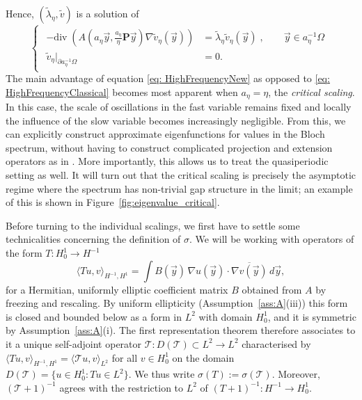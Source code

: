 \documentclass[a4paper,reqno]{amsart}
\numberwithin{equation}{section}
\numberwithin{equation}{section}		%
\numberwithin{figure}{section}			%
\numberwithin{table}{section}				%
\theoremstyle{definition}
\renewcommand{\tilde}{\widetilde}
\newcommand{\<}{\ensuremath \leq}
\renewcommand{\>}{\ensuremath \geq}
\renewcommand{\tilde}{\widetilde}
\begin{document}
Hence, $(\tilde{\lambda}_\eta, \tilde{v})$ is a solution of
\begin{equation}\label{eq: HighFrequencyNew}
    \begin{cases}
        \begin{aligned}
          - \mathrm{div} \; \left( A\left( a_\eta \vec{y}, \frac{a_\eta}{\eta}\textbf{P} \vec{y} \right) \nabla \tilde{v}_\eta({\vec y}) \right ) & = \tilde{\lambda}_\eta\tilde{v}_\eta({\vec y}) \;, \qquad \vec{y} \in a_\eta^{-1}\Omega\\
            \tilde{v}_\eta|_{\partial a_\eta^{-1}\Omega} & = 0.
        \end{aligned}
    \end{cases}
\end{equation}
The main advantage of equation \eqref{eq: HighFrequencyNew} as opposed to \eqref{eq: HighFrequencyClassical} becomes most apparent when $a_\eta = \eta$, the \textit{critical scaling}. In this case, the scale of oscillations in the fast variable remains fixed and locally the influence of the slow variable becomes increasingly negligible. From this, we can explicitly construct approximate eigenfunctions for values in the Bloch spectrum, without having to construct complicated projection and extension operators as in \cite{allaire1998bloch}. More importantly, this allows us to treat the quasiperiodic setting as well. It will turn out that the critical scaling is precisely the asymptotic regime where the spectrum has non-trivial gap structure in the limit; an example of this is shown in Figure~\ref{fig:eigenvalue_critical}.

Before turning to the individual scalings, we first have to settle some technicalities concerning the definition of $\sigma$. We will be working with operators of the form $T\colon H^1_0\to H^{-1}$
\[
  \langle Tu,v\rangle_{H^{-1},H^1}=\int B(\vec y)\,\nabla u(\vec y)\cdot
  \overline{\nabla v(\vec y)}\,d\vec y,
\]
for a Hermitian, uniformly elliptic coefficient matrix $B$ obtained from $A$ by
freezing and rescaling. By uniform ellipticity (Assumption~\ref{ass:A}(iii)) this form
is closed and bounded below as a form in $L^2$ with domain $H^1_0$, and it is symmetric by
Assumption~\ref{ass:A}(i). The first representation theorem
\cite[Thm.~VI-2.1]{kato1966perturbation} therefore associates to it a unique
self-adjoint operator $\mathcal T\colon D(\mathcal T)\subset L^2\to L^2$ characterised by
$\langle Tu,v\rangle_{H^{-1},H^1}=\langle \mathcal T u,v\rangle_{L^2}$ for all $v\in H^1_0$ on
the domain $D(\mathcal T)=\{u\in H^1_0 : Tu\in L^2\}$. We thus write $\sigma(T):=\sigma(\mathcal T)$. Moreover, $(\mathcal T+1)^{-1}$ agrees with
the restriction to $L^2$ of $(T+1)^{-1}\colon H^{-1}\to H^1_0$. 
\end{document}
